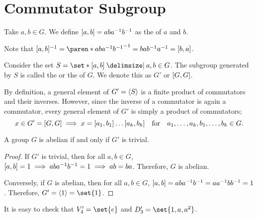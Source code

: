 \documentclass[11pt]{penrose}
\begin{document}
\section{Commutator Subgroup}
\begin{ndfn}
    Take $a,b \in G$. We define $\lbrack a,b\rbrack = aba^{-1}b^{-1}$ as the  of $a$ and $b$.
\end{ndfn}

Note that $\comm{a,b}^{-1} = \paren*{aba^{-1}b^{-1}}^{-1} = bab^{-1}a^{-1} = \comm{b,a}$.

\begin{ndfn}
    Consider the set $S = \set*{ \comm{a,b} \st a,b \in G }$. The subgroup generated by $S$ is called the  or the  of $G$. We denote this as $G'$ or $\lbrack G,G\rbrack$.
\end{ndfn}

By definition, a general element of $G'=\langle S\rangle$ is a finite product of commutators and their inverses. However, since the inverse of a commutator is again a commutator, every general element of $G'$ is simply a product of commutators;
\begin{equation*}
    x \in G' = \lbrack G,G\rbrack
    \implies
    x = \lbrack a_{1}, b_{1}\rbrack \dots \lbrack a_{k}, b_{k}\rbrack
    \quad\text{for}\quad a_{1}, \dots, a_{k}, b_{1}, \dots, b_{k} \in G.
\end{equation*}

\begin{nthm}
    A group $G$ is abelian if and only if $G'$ is trivial.
\end{nthm}
\begin{proof}
    If $G'$ is trivial, then for all $a, b \in G$, $\lbrack a,b\rbrack = 1 \implies aba^{-1}b^{-1} = 1 \implies ab = ba$. Therefore, $G$ is abelian.

    Conversely, if $G$ is abelian, then for all $a,b \in G$, $\lbrack a,b\rbrack = aba^{-1}b^{-1} = aa^{-1}bb^{-1} = 1$. Therefore, $G' = \cyclic{1} = \set{1}$.
\end{proof}

\begin{negg}
    It is easy to check that $V_{4}' = \set{e}$ and $D_{3}' = \set{1, a, a^{2}}$.
\end{negg}
\end{document}
